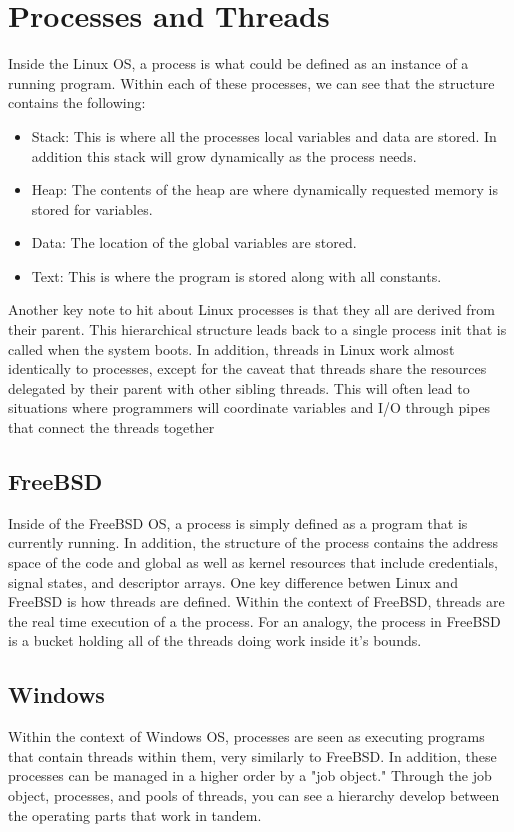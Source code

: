 \documentclass[draftclsnofoot, onecolumn] {report}
\begin{document}
\section{Processes and Threads}
Inside the Linux OS, a process is what could be defined as an instance of a running program. 
Within each of these processes, we can see that the structure contains the following:
\begin{itemize}
\item Stack: This is where all the processes local variables and data are stored. In addition this stack will grow dynamically as the process needs.
\item Heap: The contents of the heap are where dynamically requested memory is stored for variables. 
\item Data: The location of the global variables are stored.
\item Text: This is where the program is stored along with all constants.
\end{itemize}
Another key note to hit about Linux processes is that they all are derived from their parent. 
This hierarchical structure leads back to a single process init that is called when the system boots.
In addition, threads in Linux work almost identically to processes, except for the caveat that threads share the resources delegated by their parent with other sibling threads. 
This will often lead to situations where programmers will coordinate variables and I/O through pipes that connect the threads together

\subsection{FreeBSD}
Inside of the FreeBSD OS, a process is simply defined as a program that is currently running.
In addition, the structure of the process contains the address space of the code and global as well as kernel resources that include credentials, signal states, and descriptor arrays. 
One key difference betwen Linux and FreeBSD is how threads are defined.
Within the context of FreeBSD, threads are the real time execution of a the process. 
For an analogy, the process in FreeBSD is a bucket holding all of the threads doing work inside it's bounds.

\subsection{Windows}
Within the context of Windows OS, processes are seen as executing programs that contain threads within them, very similarly to FreeBSD.
In addition, these processes can be managed in a higher order by a "job object."
Through the job object, processes, and pools of threads, you can see a hierarchy develop between the operating parts that work in tandem.
\end{document}
